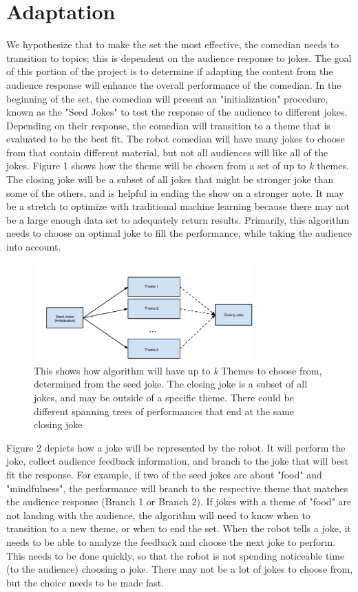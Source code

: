 \documentclass[onecolumn, draftclsnofoot,10pt, compsoc]{IEEEtran}
\begin{document}
\section{Adaptation}
  We hypothesize that to make the set the most effective, the comedian needs to transition to topics; this is dependent on the audience response to jokes. The goal of this portion of the project is to determine if adapting the content from the audience response will enhance the overall performance of the comedian. In the beginning of the set, the comedian will present an "initialization" procedure, known as the "Seed Jokes" to test the response of the audience to different jokes. Depending on their response, the comedian will transition to a theme that is evaluated to be the best fit. The robot comedian will have many jokes to choose from that contain different material, but not all audiences will like all of the jokes. Figure 1 shows how the theme will be chosen from a set of up to \textit{k} themes. The closing joke will be a subset of all jokes that might be stronger joke than some of the others, and is helpful in ending the show on a stronger note. It may be a stretch to optimize with traditional machine learning because there may not be a large enough data set to adequately return results. Primarily, this algorithm needs to choose an optimal joke to fill the performance, while taking the audience into account.

\begin{figure}[H]
  \centering
  \includegraphics[width=0.75\textwidth,height=0.75\textheight,keepaspectratio]{fig0}
  \caption{This shows how algorithm will have up to \textit{k} Themes to choose from, determined from the seed joke. The closing joke is a subset of all jokes, and may be outside of a specific theme. There could be different spanning trees of performances that end at the same closing joke}
\end{figure}

Figure 2 depicts how a joke will be represented by the robot. It will perform the joke, collect audience feedback information, and branch to the joke that will best fit the response. For example, if two of the seed jokes are about "food" and "mindfulness", the performance will branch to the respective theme that matches the audience response (Branch 1 or Branch 2). If jokes with a theme of "food" are not landing with the audience, the algorithm will need to know when to transition to a new theme, or when to end the set. When the robot tells a joke, it needs to be able to analyze the feedback and choose the next joke to perform. This needs to be done quickly, so that the robot is not spending noticeable time (to the audience) choosing a joke. There may not be a lot of jokes to choose from, but the choice needs to be made fast.
\end{document}
